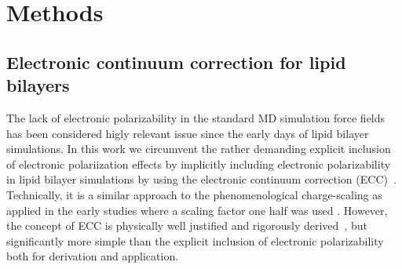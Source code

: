 \documentclass[aip,jcp,twocolumn]{revtex4}
\begin{document}




\section{Methods}

\subsection{Electronic continuum correction for lipid bilayers}\label{section:ecc}
The lack of electronic polarizability in the standard MD simulation
force fields has been considered higly relevant issue since the early days of
lipid bilayer simulations.
In this work we circumvent the rather demanding explicit inclusion
of electronic polariization effects \cite{chowdhary13} by implicitly including
electronic polarizability in lipid
bilayer simulations by using the electronic continuum correction
(ECC)~\cite{leontyev11}. 
Technically, it is a similar approach to the phenomenological charge-scaling as applied in 
the early studies where a scaling factor one half was used \cite{jonsson86,egberts94}. 
However, the concept of ECC is 
physically well justified and rigorously derived~\cite{leontyev09, leontyev10, leontyev11},
but significantly more simple than the explicit inclusion of electronic
polarizability \cite{chowdhary13} both for derivation and application.
\end{document}
